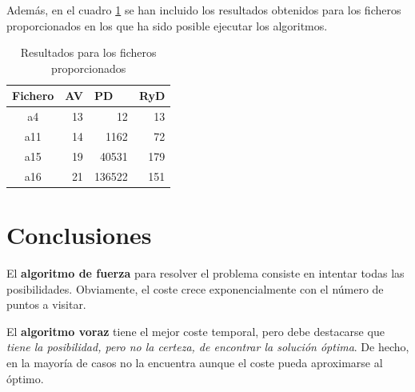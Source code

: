 \documentclass{article}
\begin{document}
Además, en el cuadro \ref{tab:ficheros-proporcionados} se han incluido los
resultados obtenidos para los ficheros proporcionados en los que ha sido posible
ejecutar los algoritmos.

\begin{table}[h]
    \centering
    \begin{tabular}{c|rrr}
        \hline
        \multicolumn{1}{l}{\textbf{Fichero}} & \multicolumn{1}{l}{\textbf{AV}} & \multicolumn{1}{l}{\textbf{PD}} & \multicolumn{1}{l}{\textbf{RyD}} \\ \hline \hline
        a4                                   & 13                              & 12                              & 13                               \\
        a11                                  & 14                              & 1162                            & 72                               \\
        a15                                  & 19                              & 40531                           & 179                              \\
        a16                                  & 21                              & 136522                          & 151
    \end{tabular}
    \caption{Resultados para los ficheros proporcionados}
    \label{tab:ficheros-proporcionados}
\end{table}


\section{Conclusiones}
    El \textbf{algoritmo de fuerza} para resolver el problema consiste en intentar todas
    las posibilidades. Obviamente, el coste crece exponencialmente con el número
    de puntos a visitar.

    El \textbf{algoritmo voraz} tiene el mejor coste temporal, pero debe destacarse que
    \emph{tiene la posibilidad, pero no la certeza, de encontrar la solución óptima}.
    De hecho, en la mayoría de casos no la encuentra aunque el coste pueda
    aproximarse al óptimo.

\end{document}
